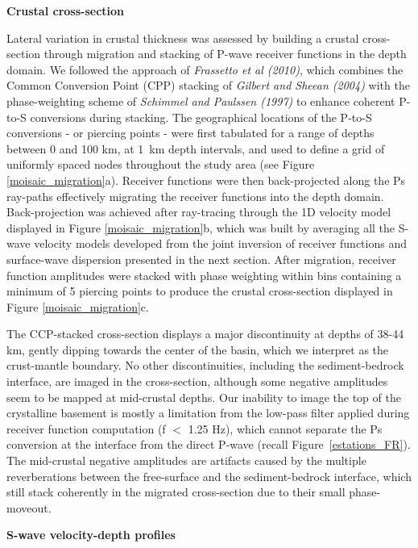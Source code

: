 \documentclass[manuscript,11pt]{geophysics}
\begin{document}
\begin{flushleft}
\textbf{Crustal cross-section}
\end{flushleft}

Lateral variation in crustal thickness was assessed by building a crustal cross-section through migration and stacking of P-wave receiver functions in the depth domain. We followed the approach of \textit{Frassetto et al (2010)}, which combines the Common Conversion Point (CPP) stacking of \textit{Gilbert and Sheean (2004)} with the phase-weighting scheme of \textit{Schimmel and Paulssen (1997)} to enhance coherent P-to-S conversions during stacking. The geographical locations of  the P-to-S conversions - or piercing points - were first tabulated for a range of depths between 0 and 100 km, at 1~km depth intervals, and used to define a grid of uniformly spaced nodes throughout the study area (see Figure \ref{moisaic_migration}a). Receiver functions were then back-projected along the Ps ray-paths effectively migrating the receiver functions into the depth domain. Back-projection was achieved after ray-tracing through the 1D velocity model displayed in Figure \ref{moisaic_migration}b, which was built by averaging all the S-wave velocity models developed from the joint inversion of receiver functions and surface-wave dispersion presented in the next section. After migration, receiver function amplitudes were stacked with phase weighting within bins containing a minimum of 5 piercing points to produce the crustal cross-section displayed in Figure \ref{moisaic_migration}c.

The CCP-stacked cross-section displays a major discontinuity at depths of 38-44 km, gently dipping towards the center of the basin, which we interpret as the crust-mantle boundary. No other discontinuities, including the sediment-bedrock interface, are imaged in the cross-section, although some negative amplitudes seem to be mapped at mid-crustal depths. Our inability to image the top of the crystalline basement is mostly a limitation from the low-pass filter applied during receiver function computation (f $<$ 1.25 Hz), which cannot separate the Ps conversion at the interface from the direct P-wave (recall Figure~\ref{estations_FR}). The mid-crustal negative amplitudes are artifacts caused by the multiple reverberations between the free-surface and the sediment-bedrock interface, which still stack coherently in the migrated cross-section due to their small phase-moveout. 

\begin{flushleft}
\textbf{S-wave velocity-depth profiles}
\end{flushleft}
\end{document}
